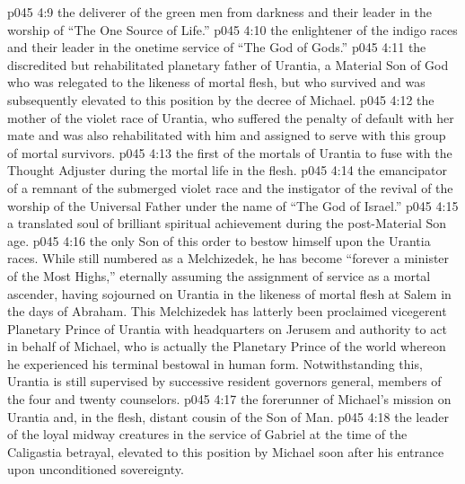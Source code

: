 \pc \vs p045 4:9 \bibnobreakspace {} the deliverer of the green men from darkness and their leader in the worship of “The One Source of Life.”
\pc \vs p045 4:10 \bibnobreakspace {} the enlightener of the indigo races and their leader in the onetime service of “The God of Gods.”
\pc \vs p045 4:11 \bibnobreakspace {} the discredited but rehabilitated planetary father of Urantia, a Material Son of God who was relegated to the likeness of mortal flesh, but who survived and was subsequently elevated to this position by the decree of Michael.
\pc \vs p045 4:12 \bibnobreakspace {} the mother of the violet race of Urantia, who suffered the penalty of default with her mate and was also rehabilitated with him and assigned to serve with this group of mortal survivors.
\pc \vs p045 4:13 \bibnobreakspace {} the first of the mortals of Urantia to fuse with the Thought Adjuster during the mortal life in the flesh.
\pc \vs p045 4:14 \bibnobreakspace {} the emancipator of a remnant of the submerged violet race and the instigator of the revival of the worship of the Universal Father under the name of “The God of Israel.”
\pc \vs p045 4:15 \bibnobreakspace {} a translated soul of brilliant spiritual achievement during the post\hyp{}Material Son age.
\pc \vs p045 4:16 \bibnobreakspace {} the only Son of this order to bestow himself upon the Urantia races. While still numbered as a Melchizedek, he has become “forever a minister of the Most Highs,” eternally assuming the assignment of service as a mortal ascender, having sojourned on Urantia in the likeness of mortal flesh at Salem in the days of Abraham. This Melchizedek has latterly been proclaimed vicegerent Planetary Prince of Urantia with headquarters on Jerusem and authority to act in behalf of Michael, who is actually the Planetary Prince of the world whereon he experienced his terminal bestowal in human form. Notwithstanding this, Urantia is still supervised by successive resident governors general, members of the four and twenty counselors.
\pc \vs p045 4:17 \bibnobreakspace {} the forerunner of Michael’s mission on Urantia and, in the flesh, distant cousin of the Son of Man.
\pc \vs p045 4:18 \bibnobreakspace {} the leader of the loyal midway creatures in the service of Gabriel at the time of the Caligastia betrayal, elevated to this position by Michael soon after his entrance upon unconditioned sovereignty.
